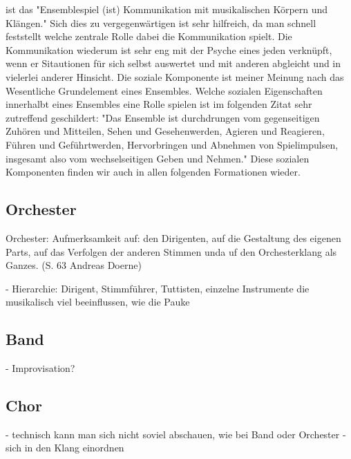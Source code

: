 ist das "Ensemblespiel (ist) Kommunikation
mit musikalischen Körpern und Klängen." \autocite[62]{doerne:umfassend_musizieren}
Sich dies zu vergegenwärtigen ist sehr hilfreich, da man schnell feststellt
welche zentrale Rolle dabei die Kommunikation spielt. Die Kommunikation wiederum
ist sehr eng mit der Psyche eines jeden verknüpft, wenn er Sitautionen für sich
selbst auswertet und mit anderen abgleicht und in vielerlei anderer Hinsicht.
Die soziale Komponente ist meiner Meinung nach das Wesentliche Grundelement
eines Ensembles. Welche sozialen Eigenschaften innerhalbt eines Ensembles eine
Rolle spielen ist im folgenden Zitat sehr zutreffend geschildert:
"Das Ensemble ist durchdrungen vom gegenseitigen Zuhören und Mitteilen, Sehen
und Gesehenwerden, Agieren und Reagieren, Führen und Geführtwerden, Hervorbringen
und Abnehmen von Spielimpulsen, insgesamt also vom wechselseitigen Geben und
Nehmen." \autocite[62]{doerne:umfassend_musizieren} Diese sozialen Komponenten
finden wir auch in allen folgenden Formationen wieder. 


\subsection{Orchester} 
Orchester:
Aufmerksamkeit auf: den Dirigenten, auf die Gestaltung des eigenen Parts, auf
das Verfolgen der anderen Stimmen unda uf den Orchesterklang als Ganzes. (S. 63
Andreas Doerne)

- Hierarchie: Dirigent, Stimmführer, Tuttisten, einzelne Instrumente die
musikalisch viel beeinflussen, wie die Pauke


\subsection{Band}
- Improvisation?


\subsection{Chor}
- technisch kann man sich nicht soviel abschauen, wie bei Band oder Orchester
- sich in den Klang einordnen


